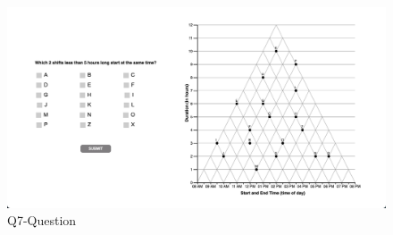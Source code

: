 \documentclass[
  letterpaper,
  DIV=11,
  numbers=noendperiod]{scrreprt}
\begin{document}
\begin{figure}

{\centering \includegraphics{analysis/SGC3A/static/questions/Q7.png}

}

\caption{\label{fig-Q7}Q7-Question}

\end{figure}
\end{document}
